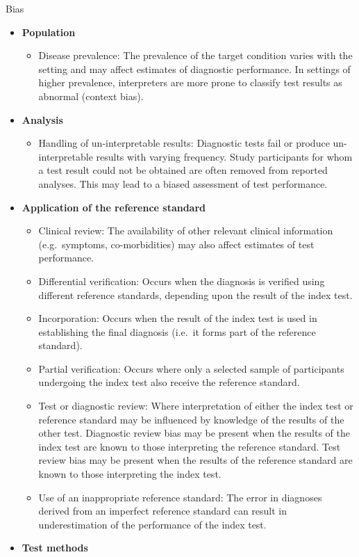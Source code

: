 \documentclass[
  10pt,
  a4paper,
  DIV=11,
  numbers=noendperiod]{scrreprt}
\providecommand{\tightlist}{%
  \setlength{\itemsep}{0pt}\setlength{\parskip}{0pt}}
\begin{document}
Bias

\begin{itemize}
\item
  \textbf{Population}

  \begin{itemize}
  \tightlist
  \item
    Disease prevalence: The prevalence of the target condition varies
    with the setting and may affect estimates of diagnostic performance.
    In settings of higher prevalence, interpreters are more prone to
    classify test results as abnormal (context bias).
  \end{itemize}
\item
  \textbf{Analysis}

  \begin{itemize}
  \tightlist
  \item
    Handling of un-interpretable results: Diagnostic tests fail or
    produce un-interpretable results with varying frequency. Study
    participants for whom a test result could not be obtained are often
    removed from reported analyses. This may lead to a biased assessment
    of test performance.
  \end{itemize}
\item
  \textbf{Application of the reference standard}

  \begin{itemize}
  \item
    Clinical review: The availability of other relevant clinical
    information (e.g.~symptoms, co-morbidities) may also affect
    estimates of test performance.
  \item
    Differential verification: Occurs when the diagnosis is verified
    using different reference standards, depending upon the result of
    the index test.
  \item
    Incorporation: Occurs when the result of the index test is used in
    establishing the final diagnosis (i.e.~it forms part of the
    reference standard).
  \item
    Partial verification: Occurs where only a selected sample of
    participants undergoing the index test also receive the reference
    standard.
  \item
    Test or diagnostic review: Where interpretation of either the index
    test or reference standard may be influenced by knowledge of the
    results of the other test. Diagnostic review bias may be present
    when the results of the index test are known to those interpreting
    the reference standard. Test review bias may be present when the
    results of the reference standard are known to those interpreting
    the index test.
  \item
    Use of an inappropriate reference standard: The error in diagnoses
    derived from an imperfect reference standard can result in
    underestimation of the performance of the index test.
  \end{itemize}
\item
  \textbf{Test methods}


\end{itemize}
\end{document}
